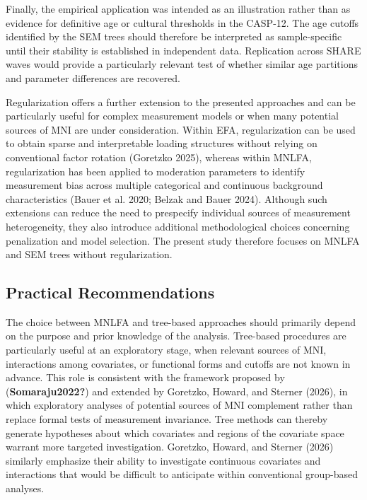 \documentclass[
  man,
  floatsintext]{apa7}
\begin{document}
Finally, the empirical application was intended as an illustration
rather than as evidence for definitive age or cultural thresholds in the
CASP-12. The age cutoffs identified by the SEM trees should therefore be
interpreted as sample-specific until their stability is established in
independent data. Replication across SHARE waves would provide a
particularly relevant test of whether similar age partitions and
parameter differences are recovered.

Regularization offers a further extension to the presented approaches
and can be particularly useful for complex measurement models or when
many potential sources of MNI are under consideration. Within EFA,
regularization can be used to obtain sparse and interpretable loading
structures without relying on conventional factor rotation (Goretzko
2025), whereas within MNLFA, regularization has been applied to
moderation parameters to identify measurement bias across multiple
categorical and continuous background characteristics (Bauer et al.
2020; Belzak and Bauer 2024). Although such extensions can reduce the
need to prespecify individual sources of measurement heterogeneity, they
also introduce additional methodological choices concerning penalization
and model selection. The present study therefore focuses on MNLFA and
SEM trees without regularization.

\subsection{Practical Recommendations}\label{practical-recommendations}

The choice between MNLFA and tree-based approaches should primarily
depend on the purpose and prior knowledge of the analysis. Tree-based
procedures are particularly useful at an exploratory stage, when
relevant sources of MNI, interactions among covariates, or functional
forms and cutoffs are not known in advance. This role is consistent with
the framework proposed by (\textbf{Somaraju2022?}) and extended by
Goretzko, Howard, and Sterner (2026), in which exploratory analyses of
potential sources of MNI complement rather than replace formal tests of
measurement invariance. Tree methods can thereby generate hypotheses
about which covariates and regions of the covariate space warrant more
targeted investigation. Goretzko, Howard, and Sterner (2026) similarly
emphasize their ability to investigate continuous covariates and
interactions that would be difficult to anticipate within conventional
group-based analyses.
\end{document}

